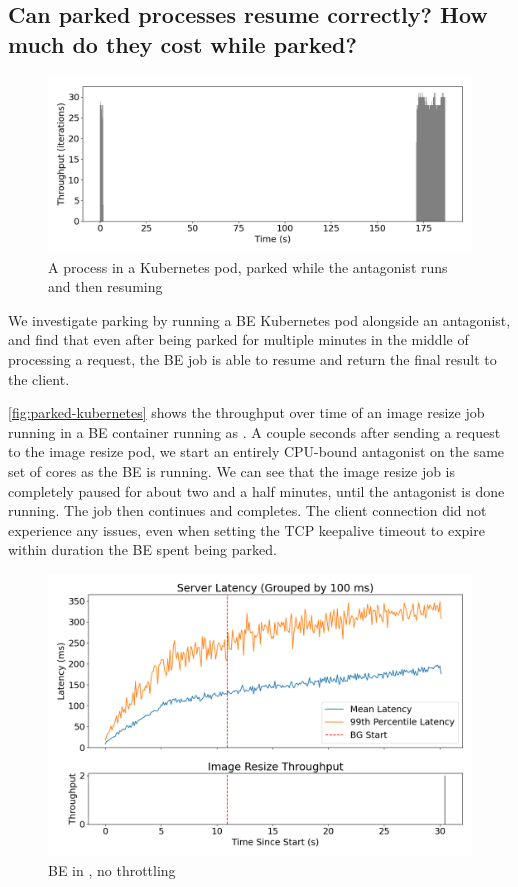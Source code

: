 \subsection{Can parked processes resume correctly? How much do they cost while
parked?}\label{ss:eval:parking}


\begin{figure}[t]
    \centering
    \includegraphics[width=\columnwidth]{graphs/parked-kubernetes.png}
    \caption{A \beclass{} process in a Kubernetes pod, parked while the
    antagonist runs and then resuming}\label{fig:parked-kubernetes}
\end{figure}

We investigate parking by running a BE Kubernetes pod alongside an antagonist,
and find that even after being parked for multiple minutes in the middle of
processing a request, the BE job is able to resume and return the final result
to the client. 

\autoref{fig:parked-kubernetes} shows the throughput over time of an image
resize job running in a BE container running as \schedbe{}. A couple seconds
after sending a request to the image resize pod, we start an entirely CPU-bound
antagonist on the same set of cores as the BE is running. We can see that the
image resize job is completely paused for about two and a half minutes, until
the antagonist is done running. The job then continues and completes. The client
connection did not experience any issues, even when setting the TCP keepalive
timeout to expire within duration the BE spent being parked.

\begin{figure}[t]
    \centering
    \includegraphics[width=\columnwidth]{graphs/overload-schedbe.png}
    \caption{BE in \schedbe{}, no throttling}\label{fig:overload-schedbe}
\end{figure}

